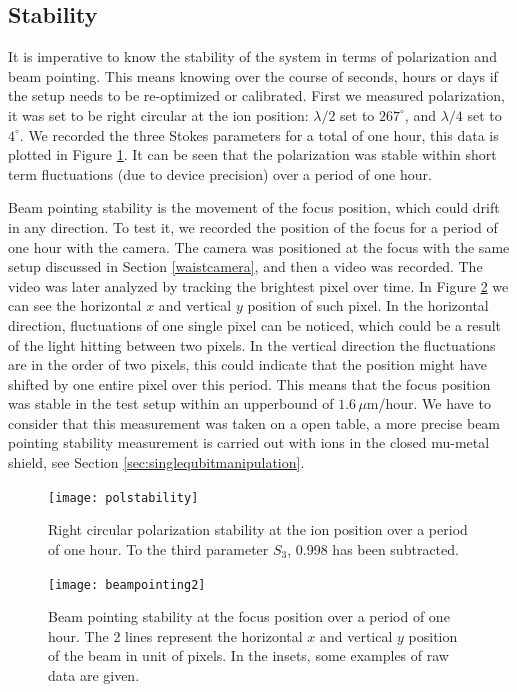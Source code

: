\subsection{Stability}
\label{sec:stability}
It is imperative to know the stability of the system in terms of polarization and beam pointing. This means knowing over the course of seconds, hours or days if the setup needs to be re-optimized or calibrated. First we measured polarization, it was set to be right circular at the ion position: $\lambda/2$ set to $267^\circ$, and $\lambda/4$ set to $4^\circ$. We recorded the three Stokes parameters for a total of one hour, this data is plotted in Figure \ref{polstability}. It can be seen that the polarization was stable within short term fluctuations (due to device precision) over a period of one hour.\par
Beam pointing stability is the movement of the focus position, which could drift in any direction. To test it, we recorded the position of the focus for a period of one hour with the camera. The camera was positioned at the focus with the same setup discussed in Section \ref{waistcamera}, and then a video was recorded. The video was later analyzed by tracking the brightest pixel over time. In Figure \ref{beampointing} we can see the horizontal $x$ and vertical $y$ position of such pixel. In the horizontal direction, fluctuations of one single pixel can be noticed, which could be a result of the light hitting between two pixels. In the vertical direction the fluctuations are in the order of two pixels, this could indicate that the position might have shifted by one entire pixel over this period. This means that the focus position was stable in the test setup within an upperbound of $1.6\,\mu$m/hour. We have to consider that this measurement was taken on a open table, a more precise beam pointing stability measurement is carried out with ions in the closed mu-metal shield, see Section \ref{sec:singlequbitmanipulation}.

\begin{figure}[H]
\centering
\texttt{[image: polstability]}
\caption{Right circular polarization stability at the ion position over a period of one hour. To the third parameter $S_3$, 0.998 has been subtracted.}
\label{polstability}
\end{figure}

\begin{figure}[H]
\centering
\texttt{[image: beampointing2]}
\caption{Beam pointing stability at the focus position over a period of one hour. The 2 lines represent the horizontal $x$ and vertical $y$ position of the beam in unit of pixels. In the insets, some examples of raw data are given.}
\label{beampointing}
\end{figure}


